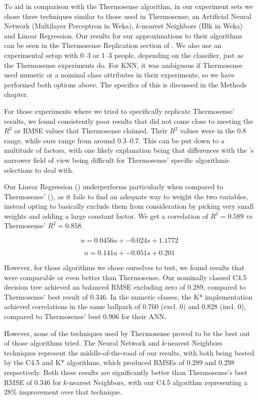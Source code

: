 \documentclass[../thesis/thesis.tex]{subfiles}
\begin{document}
To aid in comparison with the Thermosense algorithm, in our experiment sets we chose three techniques similar to those used in Thermosense; an Artificial Neural Network (Multilayer Perceptron in Weka), $k$-nearest Neighbors (IBk in Weka) and Linear Regression. Our results for our approximations to their algorithms can be seen in the Thermosense Replication section of . We also use an experimental setup with 0--3 or 1--3 people, depending on the classifier, just as the Thermosense experiments do. For KNN, it was ambiguous if Thermosense used numeric or a nominal class attributes in their experiments, so we have performed both options above. The specifics of this is discussed in the Methods chapter.

For those experiments where we tried to specifically replicate Thermosense' results, we found consistently poor results that did not come close to meeting the $R^2$ or RMSE values that Thermosense claimed. Their $R^2$ values were in the 0.8 range, while ours range from around 0.3--0.7. This can be put down to a multitude of factors, with one likely explanation being that differences with the \mlx's narrower field of view being difficult for Thermosense' specific algorithmic selections to deal with.

Our Linear Regression () underperforms particularly when compared to Thermosense' (), as it fails to find an adequate way to weight the two variables, instead opting to basically exclude them from consideration by picking very small weights and adding a large constant factor. We get a correlation of $R^2 = 0.589$ vs Thermosense' $R^2 = 0.858$.

\begin{equation} \label{eq:linreg}
n =  0.0456a + -0.024s + 1.1772
\end{equation}

\begin{equation} \label{eq:thermolinreg}
n =  0.141a + -0.051s + 0.201
\end{equation}

However, for those algorithms we chose ourselves to test, we found results that were comparable or even better than Thermosense. Our nominally classed C4.5 decision tree achieved an balanced RMSE excluding zero of 0.289, compared to Thermosense' best result of 0.346. In the numeric classes, the K* implementation achieved correlations in the same ballpark of 0.760 (excl. 0) and 0.828 (incl. 0), compared to Thermosense' best 0.906 for their ANN.

However, none of the techniques used by Thermosense proved to be the best out of those algorithms tried. The Neural Network and $k$-nearest Neighbors techniques represent the middle-of-the-road of our results, with both being bested by the C4.5 and K* algorithms, which produced RMSEs of 0.289 and 0.298 respectively. Both these results are significantly better than Thermosense's best RMSE of 0.346 for $k$-nearest Neighbors, with our C4.5 algorithm representing a 28\% improvement over that technique.


\end{document}
